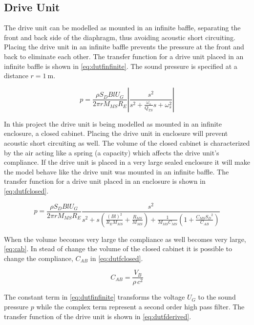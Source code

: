 \subsection{Drive Unit}
\label{seq:driveunit}
The drive unit can be modelled as mounted in an infinite baffle, separating the front and back side of the diaphragm, thus avoiding acoustic short circuiting. 
Placing the drive unit in an infinite baffle prevents the pressure at the front and back to eliminate each other. \cite[p.~44]{Elektroakustik}  
The transfer function for a drive unit placed in an infinite baffle is shown in \cref{eq:dutfinfinite}.
The sound pressure is specified at a distance $r=\SI{1}{\meter}$.  

\begin{equation}
p = \frac{\rho S_D B l U_G}{2\pi r M_{MS} R_E}\left|\frac{s^2}{s^2 + \frac{\omega_s}{Q_{TS}}s+\omega_s^2}\right|
\label{eq:dutfinfinite}
\end{equation}

In this project the drive unit is being modelled as mounted in an infinite enclosure, a closed cabinet.
Placing the drive unit in enclosure will prevent acoustic short circuiting as well. 
The volume of the closed cabinet is characterized by the air acting like a spring (a capacity) which affects the drive unit's compliance.  
If the drive unit is placed in a very large sealed enclosure it will make the model behave like the drive unit was mounted in an infinite baffle.  
The transfer function for a drive unit placed in an enclosure is shown in \cref{eq:dutfclosed}.

\begin{equation}
p = \frac{\rho S_D B l U_G}{2\pi r M_{MS} R_E}\frac{s^2}{s^2 +s \left(\frac{(Bl)^2}{R_EM_{MS}}+\frac{R_{MS}}{M_{MS}}\right)+\frac{1}{M_{MS}C_{MS}}\left(1+\frac{C_{MS}{S_D}^2}{C_{AB}}\right)}
\label{eq:dutfclosed}
\end{equation}

When the volume becomes very large the compliance as well becomes very large, \cref{eq:cab}. 
In stead of change the volume of the closed cabinet it is possible to change the compliance, $C_{AB}$ in \cref{eq:dutfclosed}. 

\begin{equation}
C_{AB} = \frac{V_B}{\rho \,c^2}
\label{eq:cab}
\end{equation} 

The constant term in \cref{eq:dutfinfinite} transforms the voltage $U_G$ to the sound pressure $p$ while the complex term represent a second order high pass filter.
The transfer function of the drive unit is shown in \cref{eq:dutfderived}.

